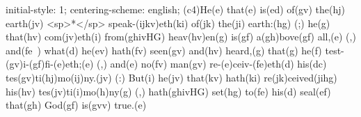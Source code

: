 initial-style: 1;
centering-scheme: english;
(c4)He(e) that(e) is(ed) of(gv) the(hj) earth(jv) <sp>*</sp> speak-(ijkv)eth(ki) of(jk) the(ji) earth:(hg) (;) he(g) that(hv) com(jv)eth(i) from(ghivHG) heav(hv)en(g) is(gf) a(gh)bove(gf) all,(e) (,) and(fe~) what(d) he(ev) hath(fv) seen(gv) and(hv) heard,(g) that(g) he(f) test-(gv)i-(gf)fi-(e)eth;(e) (,) and(e) no(fv) man(gv) re-(e)ceiv-(fe)eth(d) his(dc) tes(gv)ti(hj)mo(ij)ny.(jv) (:) But(i) he(jv) that(kv) hath(ki) re(jk)ceived(jihg) his(hv) tes(jv)ti(i)mo(h)ny(g) (,) hath(ghivHG) set(hg) to(fe) his(d) seal(ef) that(gh) God(gf) is(gvv) true.(e)
